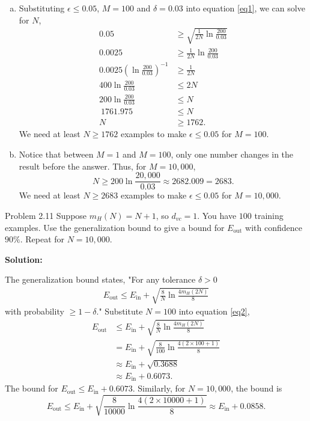 \documentclass[a4paper]{article}
\begin{document}
\begin {description}
\begin{doublespace}
\begin{enumerate}[(a)]
\item Substituting $\epsilon \leq 0.05$, $M = 100$ and $\delta = 0.03$ into equation \eqref{eq1}, we can solve for $N$,
\begin{align*}
0.05 &\geq \sqrt{\frac{1}{2N}\ln\frac{200}{0.03}} \\
0.0025 &\geq \frac{1}{2N}\ln\frac{200}{0.03} \\
0.0025\left( \ln\frac{200}{0.03} \right)^{-1} &\geq \frac{1}{2N} \\
400 \ln\frac{200}{0.03} &\leq 2N \\
200 \ln\frac{200}{0.03} &\leq N \\
~1761.975 &\leq N \\
N &\geq 1762.
\end{align*}
We need at least $N \geq 1762$ examples to make $\epsilon \leq 0.05$ for $M=100$.

\item Notice that between $M = 1$ and $M = 100$, only one number changes in the result before the answer. Thus, for $M = 10,000$,
\[N \geq 200 \ln\frac{20,000}{0.03} \approx 2682.009 = 2683.\]
We need at least $N \geq 2683$ examples to make $\epsilon \leq 0.05$ for $M=10,000$.

\end{enumerate}
\end{doublespace}

\newpage

\item[Problem 2.11] Suppose $m_H(N) = N + 1$, so $d_{vc} = 1$. You have $100$ training examples. Use the generalization bound to give a bound for $E_{\mathrm{out}}$ with confidence $90\%$. Repeat for $N = 10,000$.

\smallskip

\textbf{Solution:}
\begin{doublespace}
The generalization bound states, "For any tolerance $\delta > 0$
\begin{equation}
 	\begin{aligned}
	\label{eq2}
		E_{\mathrm{out}} \leq E_{\mathrm{in}} + \sqrt{\frac{8}{N} \ln \frac{4m_H(2N)}{8}}
 	\end{aligned}
\end{equation}
with probability $\geq 1 - \delta$."
Substitute $N = 100$ into equation \eqref{eq2},
\begin{align*}
E_{\mathrm{out}} &\leq E_{\mathrm{in}} + \sqrt{\frac{8}{N} \ln \frac{4m_H(2N)}{8}} \\
&= E_{\mathrm{in}} + \sqrt{\frac{8}{100} \ln \frac{4(2\times100+1)}{8}} \\
&\approx E_{\mathrm{in}} + \sqrt{0.3688} \\
&\approx E_{\mathrm{in}} + 0.6073.
\end{align*}
The bound for $E_{\mathrm{out}} \leq E_{\mathrm{in}} + 0.6073$. Similarly, for $N = 10,000$, the bound is
\[E_{\mathrm{out}} \leq E_{\mathrm{in}} + \sqrt{\frac{8}{10000} \ln \frac{4(2\times10000+1)}{8}} \approx E_{\mathrm{in}} + 0.0858.\]
\end{doublespace}


\end{description}
\end{document}
